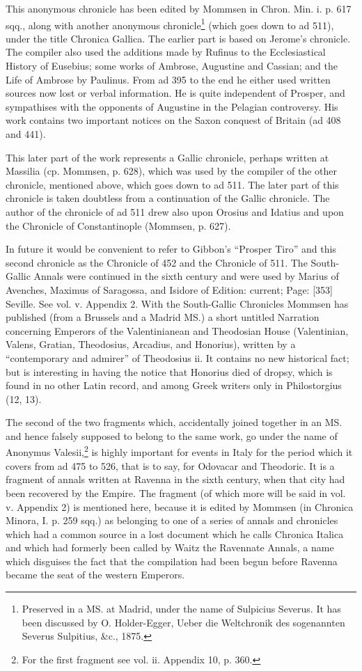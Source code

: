 This anonymous chronicle has been edited by Mommsen in Chron. Min. i. p. 617 sqq., along with another anonymous chronicle\footnote{Preserved in a MS. at Madrid, under the name of Sulpicius Severus. It has been discussed by O. Holder-Egger, Ueber die Weltchronik des sogenannten Severus Sulpitius, \&c., 1875.} (which goes down to ad 511), under the title Chronica Gallica. The earlier part is based on Jerome\texthebrew{}’s chronicle. The compiler also used the additions made by Rufinus to the Ecclesiastical History of Eusebius; some works of Ambrose, Augustine and Cassian; and the Life of Ambrose by Paulinus. From ad 395 to the end he either used written sources now lost or verbal information. He is quite independent of Prosper, and sympathises with the opponents of Augustine in the Pelagian controversy. His work contains two important notices on the Saxon conquest of Britain (ad 408 and 441).

This later part of the work represents a Gallic chronicle, perhaps written at Massilia (cp. Mommsen, p. 628), which was used by the compiler of the other chronicle, mentioned above, which goes down to ad 511. The later part of this chronicle is taken doubtless from a continuation of the Gallic chronicle. The author of the chronicle of ad 511 drew also upon Orosius and Idatius and upon the Chronicle of Constantinople (Mommsen, p. 627).

In future it would be convenient to refer to Gibbon\texthebrew{}’s \texthebrew{“}Prosper Tiro\texthebrew{}” and this second chronicle as the Chronicle of 452 and the Chronicle of 511. The South-Gallic Annals were continued in the sixth century and were used by Marius of Avenches, Maximus of Saragossa, and Isidore of Edition: current; Page: [353] Seville. See vol. v. Appendix 2. With the South-Gallic Chronicles Mommsen has published (from a Brussels and a Madrid MS.) a short untitled Narration concerning Emperors of the Valentinianean and Theodosian House (Valentinian, Valens, Gratian, Theodosius, Arcadius, and Honorius), written by a \texthebrew{“}contemporary and admirer\texthebrew{}” of Theodosius ii. It contains no new historical fact; but is interesting in having the notice that Honorius died of dropsy, which is found in no other Latin record, and among Greek writers only in Philostorgius (12, 13).

The second of the two fragments which, accidentally joined together in an MS. and hence falsely supposed to belong to the same work, go under the name of Anonymus Valesii,\footnote{For the first fragment see vol. ii. Appendix 10, p. 360.} is highly important for events in Italy for the period which it covers from ad 475 to 526, that is to say, for Odovacar and Theodoric. It is a fragment of annals written at Ravenna in the sixth century, when that city had been recovered by the Empire. The fragment (of which more will be said in vol. v. Appendix 2) is mentioned here, because it is edited by Mommsen (in Chronica Minora, I. p. 259 sqq.) as belonging to one of a series of annals and chronicles which had a common source in a lost document which he calls Chronica Italica and which had formerly been called by Waitz the Ravennate Annals, a name which disguises the fact that the compilation had been begun before Ravenna became the seat of the western Emperors.

